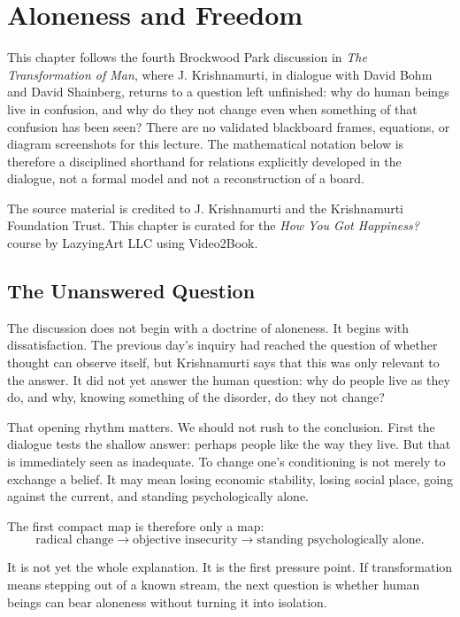 \chapter{Aloneness and Freedom}

This chapter follows the fourth Brockwood Park discussion in \emph{The Transformation of Man}, where J. Krishnamurti, in dialogue with David Bohm and David Shainberg, returns to a question left unfinished: why do human beings live in confusion, and why do they not change even when something of that confusion has been seen? There are no validated blackboard frames, equations, or diagram screenshots for this lecture. The mathematical notation below is therefore a disciplined shorthand for relations explicitly developed in the dialogue, not a formal model and not a reconstruction of a board.

The source material is credited to J. Krishnamurti and the Krishnamurti Foundation Trust. This chapter is curated for the \emph{How You Got Happiness?} course by LazyingArt LLC using Video2Book.

\section{The Unanswered Question}

The discussion does not begin with a doctrine of aloneness. It begins with dissatisfaction. The previous day's inquiry had reached the question of whether thought can observe itself, but Krishnamurti says that this was only relevant to the answer. It did not yet answer the human question: why do people live as they do, and why, knowing something of the disorder, do they not change?

That opening rhythm matters. We should not rush to the conclusion. First the dialogue tests the shallow answer: perhaps people like the way they live. But that is immediately seen as inadequate. To change one's conditioning is not merely to exchange a belief. It may mean losing economic stability, losing social place, going against the current, and standing psychologically alone.

The first compact map is therefore only a map:
\begin{equation}
\text{radical change}
\longrightarrow
\text{objective insecurity}
\longrightarrow
\text{standing psychologically alone}.
\end{equation}

It is not yet the whole explanation. It is the first pressure point. If transformation means stepping out of a known stream, the next question is whether human beings can bear aloneness without turning it into isolation.

